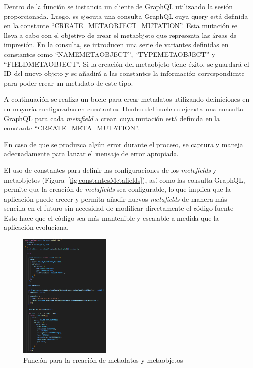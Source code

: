 \documentclass[11pt]{article}
\begin{document}
Dentro de la función se instancia un cliente de GraphQL utilizando la sesión proporcionada. Luego, se ejecuta una consulta GraphQL cuya query está definida en la constante ``CREATE\_METAOBJECT\_MUTATION''.  
Esta mutación se lleva a cabo con el objetivo de crear el metaobjeto que representa las áreas de impresión. En la consulta, se introducen una serie de variantes definidas en constantes como ``NAMEMETAOBJECT'', 
``TYPEMETAOBJECT'' y ``FIELDMETAOBJECT''. Si la creación del metaobjeto tiene éxito, se guardará el ID del nuevo objeto y se añadirá a las constantes 
la información correspondiente para poder crear un metadato de este tipo.

A continuación se realiza un bucle para crear metadatos utilizando definiciones en su mayoría configuradas en constantes. Dentro del bucle se ejecuta una consulta GraphQL para cada \textit{metafield} a crear, cuya mutación
está definida en la constante  ``CREATE\_META\_MUTATION''.

En caso de que se produzca algún error durante el proceso, se captura y maneja adecuadamente para lanzar el mensaje de error apropiado.

El uso de constantes para definir las configuraciones de los \textit{metafields} y metaobjetos (Figura~\ref{fig:constantesMetafields}), así como las consulta GraphQL, permite que la creación
de \textit{metafields} sea configurable, lo que implica que la aplicación puede crecer y permita añadir nuevos \textit{metafields} de manera más sencilla en el futuro 
sin necesidad de modificar directamente el código fuente. Esto hace que el código sea más mantenible y escalable a medida que la 
aplicación evoluciona.


\begin{figure}[H]
    \centering
    \includegraphics[width=0.4\textwidth]{imagenes-back/funcionmetaCreator.png}
    \caption{\label{fig:funcionMetafields} Función para la creación de metadatos y metaobjetos}
    \vspace{\fill}
\end{figure}
\end{document}
